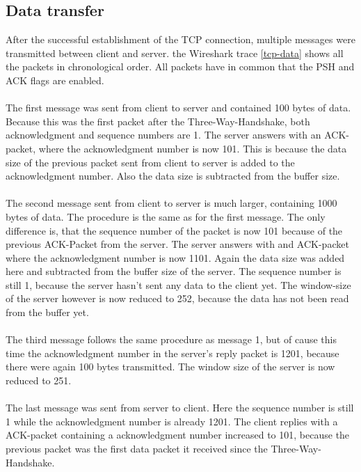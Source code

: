 \subsection{Data transfer}
After the successful establishment of the TCP connection, multiple messages were transmitted between client and server. the Wireshark trace \ref{tcp-data} shows all the packets in chronological order. All packets have in common that the PSH and ACK flags are enabled. 
\\\\
The first message was sent from client to server and contained 100 bytes of data. Because this was the first packet after the Three-Way-Handshake, both acknowledgment and sequence numbers are 1. The server answers with an ACK-packet, where the acknowledgment number is now 101. This is because the data size of the previous packet sent from client to server is added to the acknowledgment number. Also the data size is subtracted from the buffer size.
\\\\
The second message sent from client to server is much larger, containing 1000 bytes of data. The procedure is the same as for the first message. The only difference is, that the sequence number of the packet is now 101 because of the previous ACK-Packet from the server. The server answers with and ACK-packet where the acknowledgment number is now 1101. Again the data size was added here and subtracted from the buffer size of the server. The sequence number is still 1, because the server hasn't sent any data to the client yet. The window-size of the server however is now reduced to 252, because the data has not been read from the buffer yet.
\\\\
The third message follows the same procedure as message 1, but of cause this time the acknowledgment number in the server's reply packet is 1201, because there were again 100 bytes transmitted. The window size of the server is now reduced to 251.
\\\\
The last message was sent from server to client. Here the sequence number is still 1 while the acknowledgment number is already 1201. The client replies with a ACK-packet containing a acknowledgment number increased to 101, because the previous packet was the first data packet it received since the Three-Way-Handshake.

